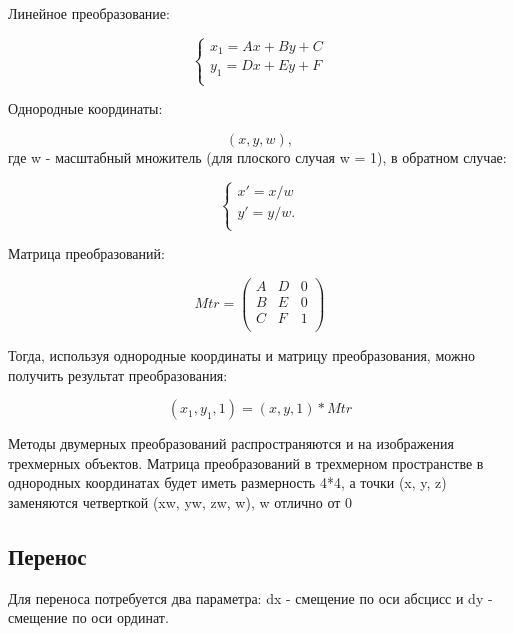 Линейное преобразование:

\begin{equation}
	{\begin{cases}
			x_1 = Ax + By + C \\
			y_1 = Dx + Ey + F \\
		\end{cases}}
\end{equation}

Однородные координаты:

\begin{equation}
	(x, y, w),
\end{equation}
где w - масштабный множитель (для плоского случая w = 1), в обратном случае:

\begin{equation}
	{\begin{cases}
			x' = x / w  \\
			y' = y / w. \\
		\end{cases}}
\end{equation}

Матрица преобразований:

\begin{equation}
	Mtr = \left(
	\begin{array}{cccc}
			A & D & 0 \\
			B & E & 0 \\
			C & F & 1 \\
		\end{array}
	\right)
\end{equation}

Тогда, используя однородные координаты и матрицу преобразования, можно получить результат преобразования:

\begin{equation}
	(x_1, y_1, 1) = (x, y, 1) * Mtr
\end{equation}

Методы двумерных преобразований распространяются и на изображения трехмерных объектов.
Матрица преобразований  в трехмерном пространстве  в однородных координатах будет иметь размерность 4*4,
а точки (x, y, z)
заменяются четверткой (xw, yw, zw, w), w отлично от 0

\subsection {Перенос}

Для переноса потребуется два параметра: dx - смещение по оси абсцисс и dy - смещение по оси ординат.

